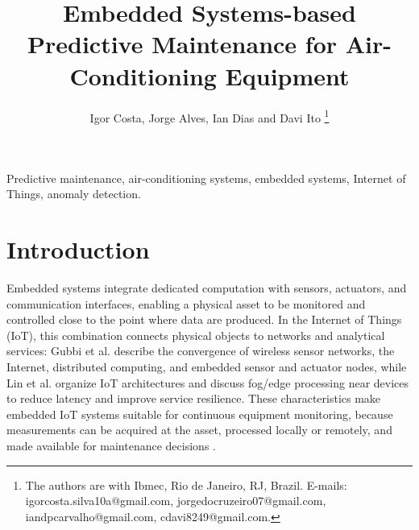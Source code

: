 \documentclass[english,hidelinks]{sbrt}
\begin{document}
\title{Embedded Systems-based Predictive Maintenance for Air-Conditioning Equipment}

\author{Igor Costa, Jorge Alves, Ian Dias and Davi Ito
  \thanks{The authors are with Ibmec, Rio de Janeiro, RJ, Brazil.
  E-mails: igorcosta.silva10a@gmail.com,
  jorgedocruzeiro07@gmail.com,
  iandpcarvalho@gmail.com,
  cdavi8249@gmail.com.}%
  }

\maketitle


\begin{abstract}
\end{abstract}
\begin{keywords}
Predictive maintenance, air-conditioning systems, embedded systems, Internet of Things, anomaly detection.
\end{keywords}

\section{Introduction}

Embedded systems integrate dedicated computation with sensors, actuators, and communication interfaces, enabling a physical asset to be monitored and controlled close to the point where data are produced. In the Internet of Things (IoT), this combination connects physical objects to networks and analytical services: Gubbi et al. describe the convergence of wireless sensor networks, the Internet, distributed computing, and embedded sensor and actuator nodes, while Lin et al. organize IoT architectures and discuss fog/edge processing near devices to reduce latency and improve service resilience. These characteristics make embedded IoT systems suitable for continuous equipment monitoring, because measurements can be acquired at the asset, processed locally or remotely, and made available for maintenance decisions \cite{gubbi2013iot,lin2017iot}.
\end{document}
